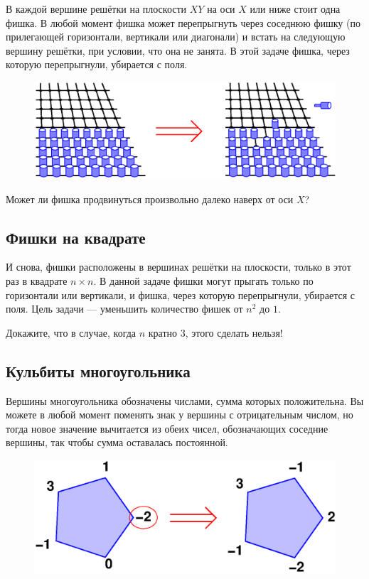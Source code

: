 В каждой вершине решётки на плоскости $XY$ на оси $X$ или ниже стоит одна фишка.
В любой момент фишка может перепрыгнуть через соседнюю фишку (по прилегающей горизонтали, вертикали или диагонали) и встать на следующую вершину решётки, при условии, что она не занята.
В этой задаче фишка, через которую перепрыгнули, убирается с поля.

\begin{figure}[h!]
\centering
\includegraphics[scale=0.6]{Figs/Algorithms/pegs}
\end{figure}

Может ли фишка продвинуться произвольно далеко наверх от оси $X$?

\subsection*{Фишки на квадрате}%

И снова, фишки расположены в вершинах решётки на плоскости, только в этот раз в квадрате $n\times n$.
В данной задаче фишки могут прыгать только по горизонтали или вертикали, и фишка, через которую перепрыгнули, убирается с поля.
Цель задачи --- уменьшить количество фишек от $n^2$ до $1$.

Докажите, что в случае, когда $n$ кратно $3$, этого сделать нельзя!

\subsection*{Кульбиты многоугольника}%

Вершины многоугольника обозначены числами, сумма которых положительна.
Вы можете в любой момент поменять знак у вершины с отрицательным числом, но тогда новое значение вычитается из обеих чисел, обозначающих соседние вершины, так чтобы сумма оставалась постоянной.

\begin{figure}[h!]
\centering
\includegraphics[scale=0.6]{Figs/Algorithms/pent}
\end{figure}

